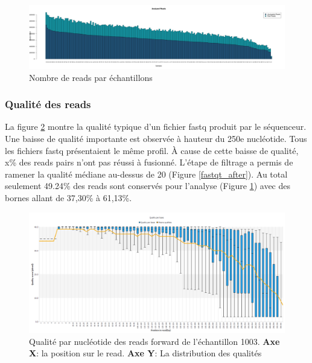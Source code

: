 \documentclass[12pt,a4paper]{article}
\begin{document}
\begin{figure}[ht]
\begin{center}
\includegraphics[scale=0.25]{img/pipeline.png}\hfill
\end{center}
\caption{Nombre de reads par échantillons}
\label{readcount}
\end{figure}


\subsubsection{Qualité des reads}
La figure \ref{fastqt} montre la qualité typique d'un fichier fastq produit par le séquenceur. Une baisse de qualité importante est observée à hauteur du 250e nucléotide. Tous les fichiers fastq présentaient le même profil. 
À cause de cette baisse de qualité, x\% des reads pairs n'ont pas réussi à fusionné. 
L'étape de filtrage a permis de ramener la qualité médiane au-dessus de 20 (Figure \ref{fastqt_after}).
Au total seulement 49.24\% des reads sont conservés pour l'analyse (Figure \ref{readcount}) avec des bornes allant de 37,30\% à 61,13\%.



\begin{figure}[ht]
\begin{center}
\includegraphics[scale=0.45]{img/1003_forward.png}\hfill
\end{center}
\caption{Qualité par nucléotide des reads forward de l'échantillon 1003. \textbf{Axe X}: la position sur le read. \textbf{Axe Y}: La distribution des qualités}
\label{fastqt}
\end{figure}
\end{document}
